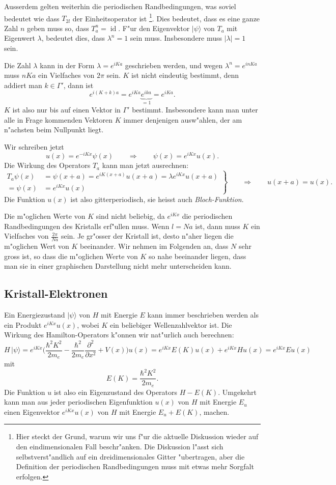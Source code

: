 Ausserdem gelten weiterhin die periodischen Randbedingungen,
was soviel bedeutet wie dass $T_{2l}$ der Einheitsoperator ist%
\footnote{Hier
steckt der Grund, warum wir uns f"ur die aktuelle Diskussion wieder
auf den eindimensionalen Fall beschr"anken. Die Diskussion l"asst sich
selbstverst"andlich auf ein dreidimensionales Gitter "ubertragen, aber
die Definition der periodischen Randbedingungen muss mit etwas mehr
Sorgfalt erfolgen.}.
Dies bedeutet, dass es eine ganze Zahl $n$ geben muss so,
dass $T_a^n=\operatorname{id}$. F"ur den Eigenvektor $|\psi\rangle$
von $T_a$ mit Eigenwert $\lambda$, bedeutet dies, dass $\lambda^n=1$
sein muss. Insbesondere muss $|\lambda|=1$ sein. 

Die Zahl $\lambda$ kann in der Form $\lambda=e^{iKa}$ geschrieben werden,
und wegen $\lambda^n=e^{inKa}$ muss $nKa$ ein Vielfaches von $2\pi$ sein.
$K$ ist nicht eindeutig bestimmt, denn addiert man $k\in\Gamma'$, dann ist
\[
e^{i(K+k)a}=e^{iKa}\underbrace{e^{ika}}_{=1}=e^{iKa}.
\]
$K$ ist also nur bis auf einen Vektor in $\Gamma'$ bestimmt.
Insbesondere kann man unter alle in Frage kommenden Vektoren $K$ immer
denjenigen ausw"ahlen, der am n"achsten beim Nullpunkt liegt.

Wir schreiben jetzt
\[
u(x)=e^{-iKx}\psi(x)
\qquad\Rightarrow\qquad
\psi(x)=e^{iKx}u(x).
\]
Die Wirkung des Operators $T_a$ kann man jetzt ausrechnen:
\begin{equation}
\left.
\begin{aligned}
T_a\psi(x)&=\psi(x+a)=e^{iK(x+a)}u(x+a)=\lambda e^{iKx}u(x+a)
\\
=\psi(x)&=e^{iKx}u(x)
\end{aligned}
\right\}
\qquad\Rightarrow\qquad
u(x+a)=u(x).
\end{equation}
Die Funktion $u(x)$ ist also gitterperiodisch, sie heisst auch
{\em Bloch-Funktion}.
%

Die m"oglichen Werte von $K$ sind nicht beliebig, da $e^{iKx}$ die
periodischen Randbedingungen des Kristalls erf"ullen muss. Wenn $l=Na$
ist, dann muss $K$ ein Vielfaches von $\frac{2\pi}{Na}$ sein.
Je gr"osser der Kristall ist, desto n"aher liegen die m"oglichen
Wert von $K$ beeinander.
Wir nehmen im Folgenden an, dass $N$ sehr gross ist, so dass die
m"oglichen Werte von $K$ so nahe beeinander liegen, dass man sie in
einer graphischen Darstellung nicht mehr unterscheiden kann.

\subsection{Kristall-Elektronen}
Ein Energiezustand $|\psi\rangle$ von $H$ mit Energie $E$
kann immer beschrieben werden als ein Produkt $e^{iKx} u(x)$,
wobei $K$ ein beliebiger Wellenzahlvektor ist.
Die Wirkung des Hamilton-Operators k"onnen wir nat"urlich auch
berechnen:
\[
H\,|\psi\rangle
=
e^{iKx}\biggl(
\frac{\hbar^2K^2}{2m_e}-\frac{\hbar^2}{2m_e}\frac{\partial^2}{\partial x^2}
+V(x)
\biggr)u(x)
=
e^{iKx}E(K)u(x) + e^{iKx} Hu(x)
=
e^{iKx}Eu(x)
\]
mit
\[
E(K)=\frac{\hbar^2K^2}{2m_e}.
\]
Die Funktion $u$ ist also ein Eigenzustand des Operators $H-E(K)$. Umgekehrt
kann man aus jeder periodischen Eigenfunktion $u(x)$ von $H$ mit Energie
$E_u$ einen Eigenvektor $e^{iKx}u(x)$ von $H$ mit Energie $E_u+E(K)$, machen.

